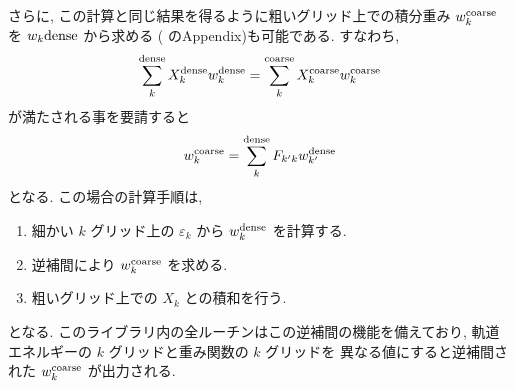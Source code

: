 \documentclass[letterpaper,10pt,dvipdfmx,openany]{sphinxmanual}
\begin{document}
\sphinxAtStartPar
さらに,
この計算と同じ結果を得るように粗いグリッド上での積分重み
\(w_k^{\rm coarse}\) を  \(w_k{\rm dense}\) から求める
 ( {\hyperref[\detokenize{ref:ref}]{}} のAppendix)も可能である.
すなわち,
\begin{equation*}
\begin{split}\begin{align}
\sum_k^{\rm dense} X_k^{\rm dense} w_k^{\rm dense}
= \sum_k^{\rm coarse} X_k^{\rm coarse} w_k^{\rm coarse}
\end{align}\end{split}
\end{equation*}
\sphinxAtStartPar
が満たされる事を要請すると
\begin{equation*}
\begin{split}\begin{align}
w_k^{\rm coarse} = \sum_k^{\rm dense} F_{k' k}
w_{k'}^{\rm dense}
\end{align}\end{split}
\end{equation*}
\sphinxAtStartPar
となる. この場合の計算手順は,
\begin{enumerate}
%
\item {} 
\sphinxAtStartPar
細かい \(k\) グリッド上の  \(\varepsilon_k\) から
\(w_k^{\rm dense}\) を計算する.

\item {} 
\sphinxAtStartPar
逆補間により \(w_k^{\rm coarse}\) を求める.

\item {} 
\sphinxAtStartPar
粗いグリッド上での \(X_k\) との積和を行う.

\end{enumerate}

\sphinxAtStartPar
となる. このライブラリ内の全ルーチンはこの逆補間の機能を備えており,
軌道エネルギーの \(k\) グリッドと重み関数の \(k\) グリッドを
異なる値にすると逆補間された \(w_k^{\rm coarse}\) が出力される.
\end{document}

